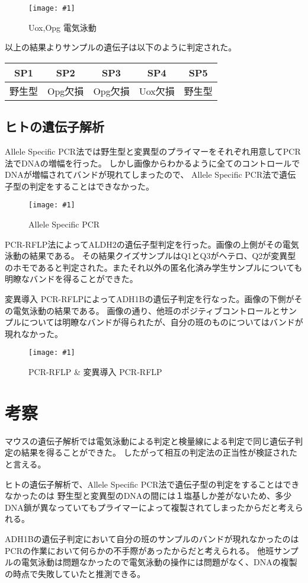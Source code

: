 \documentclass[a4paper,papersize,dvipdfmx]{jsarticle}
\newcommand{\piccap}[3]{\begin{figure}[H] \centering \texttt{[image: \#1]} \caption{#3} \label{fig {#1}} \end{figure}} %
\begin{document}
\piccap{images/jt-1.JPG}{10}{Uox,Opg 電気泳動}

以上の結果よりサンプルの遺伝子は以下のように判定された。

\begin{table}[H]
\begin{center}
\begin{tabular}{|c|c|c|c|c|}
\hline
SP1 & SP2   & SP3   & SP4   & SP5 \\ \hline
野生型 & Opg欠損 & Opg欠損 & Uox欠損 & 野生型 \\ \hline
\end{tabular}
\end{center}
\end{table}

\subsection*{ヒトの遺伝子解析}
Allele Specific PCR法では野生型と変異型のプライマーをそれぞれ用意してPCR法でDNAの増幅を行った。
しかし画像からわかるように全てのコントロールでDNAが増幅されてバンドが現れてしまったので、
Allele Specific PCR法で遺伝子型の判定をすることはできなかった。
\piccap{images/jt-h.JPG}{10}{Allele Specific PCR}

PCR-RFLP法によってALDH2の遺伝子型判定を行った。画像の上側がその電気泳動の結果である。
その結果クイズサンプルはQ1とQ3がヘテロ、Q2が変異型のホモであると判定された。またそれ以外の匿名化済み学生サンプルについても
明瞭なバンドを得ることができた。

変異導入 PCR-RFLPによってADH1Bの遺伝子判定を行なった。画像の下側がその電気泳動の結果である。
画像の通り、他班のポジティブコントロールとサンプルについては明瞭なバンドが得られたが、自分の班のものについてはバンドが現れなかった。

\piccap{images/jt-fg.JPG}{10}{PCR-RFLP & 変異導入 PCR-RFLP}

\section*{考察}
マウスの遺伝子解析では電気泳動による判定と検量線による判定で同じ遺伝子判定の結果を得ることができた。
したがって相互の判定法の正当性が検証されたと言える。

ヒトの遺伝子解析で、Allele Specific PCR法で遺伝子型の判定をすることはできなかったのは
野生型と変異型のDNAの間には１塩基しか差がないため、多少DNA鎖が異なっていてもプライマーによって複製されてしまったからだと考えられる。

ADH1Bの遺伝子判定において自分の班のサンプルのバンドが現れなかったのはPCRの作業において何らかの不手際があったからだと考えられる。
他班サンプルの電気泳動は問題なかったので電気泳動の操作には問題がなく、DNAの複製の時点で失敗していたと推測できる。
\end{document}
